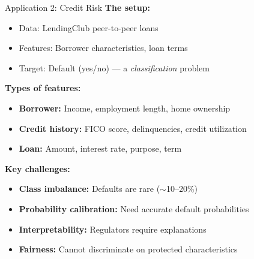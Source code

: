 \documentclass[10pt]{beamer}
\begin{document}
\begin{frame}{Application 2: Credit Risk}
  \textbf{The setup:}
  \begin{itemize}
    \item Data: LendingClub peer-to-peer loans
    \item Features: Borrower characteristics, loan terms
    \item Target: Default (yes/no) — a \emph{classification} problem
  \end{itemize}
  
  \vspace{0.5em}
  \textbf{Types of features:}
  \begin{itemize}
    \item \textbf{Borrower:} Income, employment length, home ownership
    \item \textbf{Credit history:} FICO score, delinquencies, credit utilization
    \item \textbf{Loan:} Amount, interest rate, purpose, term
  \end{itemize}
  
  \vspace{0.5em}
  \textbf{Key challenges:}
  \begin{itemize}
    \item \textbf{Class imbalance:} Defaults are rare ($\sim$10--20\%)
    \item \textbf{Probability calibration:} Need accurate default probabilities
    \item \textbf{Interpretability:} Regulators require explanations
    \item \textbf{Fairness:} Cannot discriminate on protected characteristics
  \end{itemize}
\end{frame}
\end{document}
